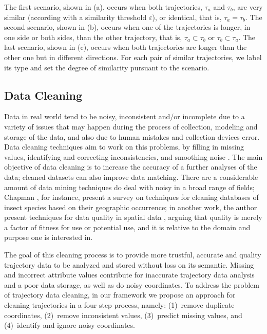 \documentclass[a4paper,12pt]{article}
\begin{document}
The first scenario, shown in (a), occurs when both trajectories, $\tau_a$ and $\tau_b$, are very similar (according with a similarity threshold $\varepsilon$), or identical, that is, $\tau_a = \tau_b$. The second scenario, shown in (b), occurs when one of the trajectories is longer, in one side or both sides, than the other trajectory, that is, $\tau_a \subset \tau_b$ or $\tau_b \subset \tau_a$. The last scenario, shown in (c), occurs when both trajectories are longer than the other one but in different directions. For each pair of similar trajectories, we label its type and set the degree of similarity pursuant to the scenario. 

\subsection{Data Cleaning}\label{sec:cleaning}
Data in real world tend to be noisy, inconsistent and/or incomplete due to a variety of issues that may happen during the process of collection, modeling and storage of the data, and also due to human mistakes and collection devices error. Data cleaning techniques aim to work on this problems, by filling in missing values, identifying and correcting inconsistencies, and smoothing noise \cite{han2011}. The main objective of data cleaning is to increase the accuracy of a further analyses of the data; cleaned datasets can also improve data matching. There are a considerable amount of data mining techniques do deal with noisy in a broad range of fields; Chapman \cite{chapman2005cleaning}, for instance, present a survey on techniques for cleaning databases of insect species based on their geographic occurrence; in another work, the author present techniques for data quality in spatial data \cite{chapman2005quality}, arguing that quality is merely a factor of fitness for use or potential use, and it is relative to the domain and purpose one is interested in. 

The goal of this cleaning process is to provide more trustful, accurate and quality trajectory data to be analyzed and stored without loss on its semantic. Missing and incorrect attribute values contribute for inaccurate trajectory data analysis and a poor data storage, as well as do noisy coordinates. To address the problem of trajectory data cleaning, in our framework we propose an approach for cleaning trajectories in a four step process, namely: (1)~remove duplicate coordinates, (2)~remove inconsistent values, (3)~predict missing values, and (4)~identify and ignore noisy coordinates. 
\end{document}
